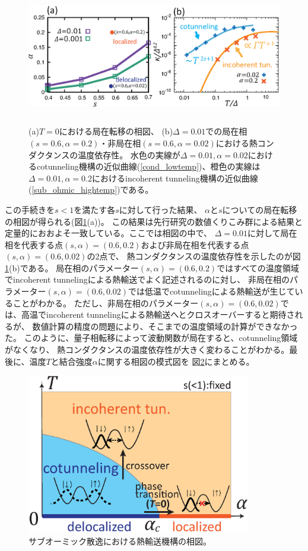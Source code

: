\begin{figure}[tb]
	\centering
	\includegraphics[height=6.0cm]{localization_phasediagram.eps}
	\caption{
	(a)$T=0$における局在転移の相図、 (b)$\Delta=0.01$での局在相$(s=0.6,\alpha=0.2)$・非局在相$(s=0.6,\alpha=0.02)$における熱コンダクタンスの温度依存性。
	水色の実線が$\Delta=0.01,\alpha=0.02$におけるcotunneling機構の近似曲線(\ref{cond_lowtemp})、橙色の実線は$\Delta=0.01,\alpha=0.2$におけるincoherent tunneling機構の近似曲線(\ref{sub_ohmic_hightemp})である。
	}
	\label{fig:localization_phasediagram}
\end{figure}

この手続きを$s<1$を満たす各$s$に対して行った結果、 $\alpha$と$s$についての局在転移の相図が得られる(図\ref{fig:localization_phasediagram}(a))。
この結果は先行研究の数値くりこみ群による結果\cite{Vojta05}と定量的におおよそ一致している。ここでは相図の中で、
$\Delta=0.01$に対して局在相を代表する点$(s,\alpha) = (0.6,0.2)$および非局在相を代表する点$(s,\alpha) = (0.6,0.02)$の2点で、
熱コンダクタンスの温度依存性を示したのが図\ref{fig:localization_phasediagram}(b)である。
局在相のパラメーター$(s,\alpha) = (0.6,0.2)$ではすべての温度領域でincoherent tunnelingによる熱輸送でよく記述されるのに対し、
非局在相のパラメーター$(s,\alpha) = (0.6,0.02)$では低温でcotunnelingによる熱輸送が生じていることがわかる。
ただし、非局在相のパラメーター$(s,\alpha) = (0.6,0.02)$では、高温でincoherent tunnelingによる熱輸送へとクロスオーバーすると期待されるが、
数値計算の精度の問題により、そこまでの温度領域の計算ができなかった。
このように、量子相転移によって波動関数が局在すると、cotunneling領域がなくなり、
熱コンダクタンスの温度依存性が大きく変わることがわかる。最後に、温度$T$と結合強度$\alpha$に関する相図の模式図を
図\ref{fig:sub_ohmic_phasediagram}にまとめる。

\begin{figure}[tb]
	\centering
	\includegraphics[height=7.0cm]{sub_ohmic_phasediagram.eps}
	\caption{
	サブオーミック散逸における熱輸送機構の相図。
	}
	\label{fig:sub_ohmic_phasediagram}
\end{figure}
